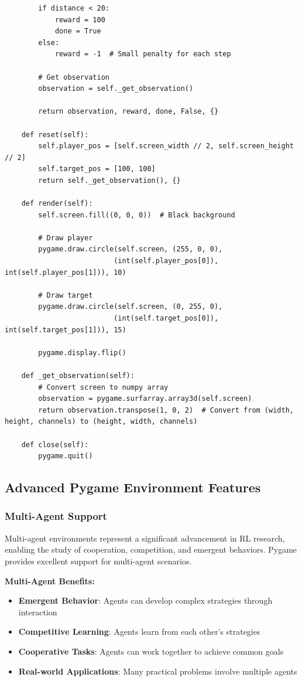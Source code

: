 \documentclass[12pt]{article}
\begin{document}
{{{\begin{verbatim}
        if distance < 20:
            reward = 100
            done = True
        else:
            reward = -1  # Small penalty for each step
            
        # Get observation
        observation = self._get_observation()
        
        return observation, reward, done, False, {}
        
    def reset(self):
        self.player_pos = [self.screen_width // 2, self.screen_height // 2]
        self.target_pos = [100, 100]
        return self._get_observation(), {}
        
    def render(self):
        self.screen.fill((0, 0, 0))  # Black background
        
        # Draw player
        pygame.draw.circle(self.screen, (255, 0, 0), 
                          (int(self.player_pos[0]), int(self.player_pos[1])), 10)
        
        # Draw target
        pygame.draw.circle(self.screen, (0, 255, 0), 
                          (int(self.target_pos[0]), int(self.target_pos[1])), 15)
        
        pygame.display.flip()
        
    def _get_observation(self):
        # Convert screen to numpy array
        observation = pygame.surfarray.array3d(self.screen)
        return observation.transpose(1, 0, 2)  # Convert from (width, height, channels) to (height, width, channels)
        
    def close(self):
        pygame.quit()
\end{verbatim}

\subsection{Advanced Pygame Environment Features}

\subsubsection{Multi-Agent Support}

Multi-agent environments represent a significant advancement in RL research, enabling the study of cooperation, competition, and emergent behaviors. Pygame provides excellent support for multi-agent scenarios.

\textbf{Multi-Agent Benefits:}
\begin{itemize}
    \item \textbf{Emergent Behavior}: Agents can develop complex strategies through interaction
    \item \textbf{Competitive Learning}: Agents learn from each other's strategies
    \item \textbf{Cooperative Tasks}: Agents can work together to achieve common goals
    \item \textbf{Real-world Applications}: Many practical problems involve multiple agents
\end{itemize}

}}}
\end{document}
